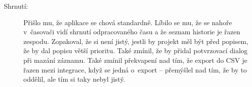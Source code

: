 \begin{description}
\item[Shrnutí:] Přišlo mu, že aplikace se chová standardně. Líbilo se mu, že se nahoře v~časovači vidí shrnutí odpracovaného času a že seznam historie je řazen zespodu. Zopakoval, že si není jistý, jestli by projekt měl být před popisem, že by dal popisu větší prioritu. Také zmínil, že by přidal potvrzovací dialog při mazání záznamu. Také zmínil překvapení nad tím, že export do CSV je řazen mezi integrace, když se jedná o~export – přemýšlel nad tím, že by to oddělil, ale tím si taky nebyl jistý.
\end{description}





















































